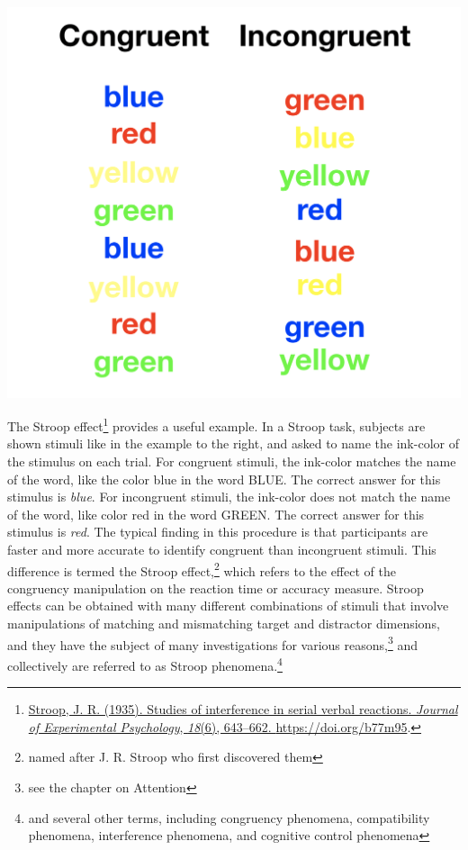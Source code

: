 \documentclass[
  oneside,
  12pt]{crumpbook}
\newenvironment{floatright50}{%
  \wrapfigure{R}{.5\textwidth}%
  }{%
  \endwrapfigure}
\begin{document}
\begin{floatright50}
\includegraphics[width=1\linewidth]{imgs/Stroop_stim}

\end{floatright50}

The Stroop effect\footnote{\protect\hyperlink{ref-Stroop1935}{Stroop, J. R. (1935). Studies of interference in serial verbal reactions. \emph{Journal of Experimental Psychology}, \emph{18}(6), 643--662. \url{https://doi.org/b77m95}}.} provides a useful example. In a Stroop task, subjects are shown stimuli like in the example to the right, and asked to name the ink-color of the stimulus on each trial. For congruent stimuli, the ink-color matches the name of the word, like the color blue in the word BLUE. The correct answer for this stimulus is \emph{blue}. For incongruent stimuli, the ink-color does not match the name of the word, like color red in the word GREEN. The correct answer for this stimulus is \emph{red}. The typical finding in this procedure is that participants are faster and more accurate to identify congruent than incongruent stimuli. This difference is termed the Stroop effect,\footnote{named after J. R. Stroop who first discovered them} which refers to the effect of the congruency manipulation on the reaction time or accuracy measure. Stroop effects can be obtained with many different combinations of stimuli that involve manipulations of matching and mismatching target and distractor dimensions, and they have the subject of many investigations for various reasons,\footnote{see the chapter on Attention} and collectively are referred to as Stroop phenomena.\footnote{and several other terms, including congruency phenomena, compatibility phenomena, interference phenomena, and cognitive control phenomena}
\end{document}
